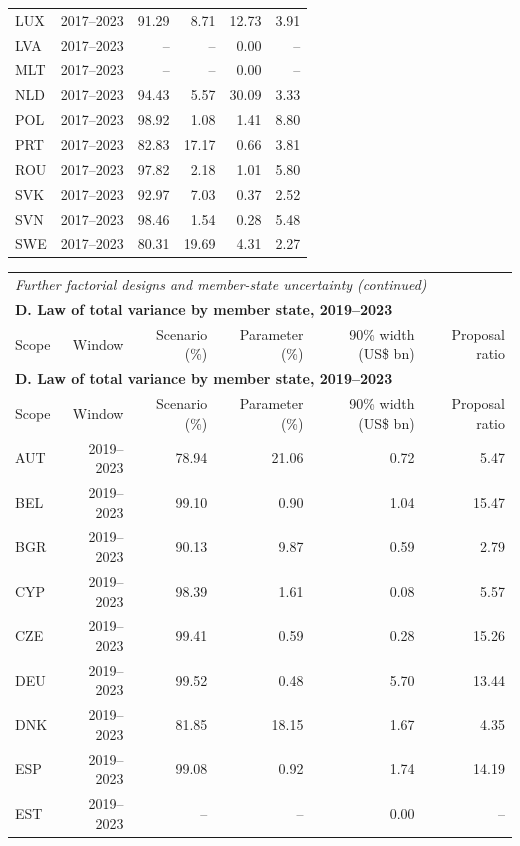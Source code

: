 {\begin{longtable}{@{}lrrrrr@{}}
LUX & 2017–2023 & 91.29 &  8.71 & 12.73 &  3.91 \\
LVA & 2017–2023 & -- & -- &  0.00 & -- \\
MLT & 2017–2023 & -- & -- &  0.00 & -- \\
NLD & 2017–2023 & 94.43 &  5.57 & 30.09 &  3.33 \\
POL & 2017–2023 & 98.92 &  1.08 &  1.41 &  8.80 \\
PRT & 2017–2023 & 82.83 & 17.17 &  0.66 &  3.81 \\
ROU & 2017–2023 & 97.82 &  2.18 &  1.01 &  5.80 \\
SVK & 2017–2023 & 92.97 &  7.03 &  0.37 &  2.52 \\
SVN & 2017–2023 & 98.46 &  1.54 &  0.28 &  5.48 \\
SWE & 2017–2023 & 80.31 & 19.69 &  4.31 &  2.27 \\
\end{longtable}
\addtocounter{table}{-1}
\begin{longtable}{@{}lrrrrr@{}}
\multicolumn{6}{l}{\textit{Further factorial designs and member-state uncertainty (continued)}} \\
\multicolumn{6}{l}{\textbf{D. Law of total variance by member state, 2019–2023}} \\
\toprule
Scope & Window & Scenario (\%) & Parameter (\%) & 90\% width (US\$ bn) & Proposal ratio \\
\midrule
\endfirsthead
\multicolumn{6}{l}{\textbf{D. Law of total variance by member state, 2019–2023}} \\
\toprule
Scope & Window & Scenario (\%) & Parameter (\%) & 90\% width (US\$ bn) & Proposal ratio \\
\midrule
\endhead
\midrule
\endfoot
\bottomrule
\endlastfoot
AUT & 2019–2023 & 78.94 & 21.06 &  0.72 &  5.47 \\
BEL & 2019–2023 & 99.10 &  0.90 &  1.04 & 15.47 \\
BGR & 2019–2023 & 90.13 &  9.87 &  0.59 &  2.79 \\
CYP & 2019–2023 & 98.39 &  1.61 &  0.08 &  5.57 \\
CZE & 2019–2023 & 99.41 &  0.59 &  0.28 & 15.26 \\
DEU & 2019–2023 & 99.52 &  0.48 &  5.70 & 13.44 \\
DNK & 2019–2023 & 81.85 & 18.15 &  1.67 &  4.35 \\
ESP & 2019–2023 & 99.08 &  0.92 &  1.74 & 14.19 \\
EST & 2019–2023 & -- & -- &  0.00 & -- \\

\end{longtable}}
